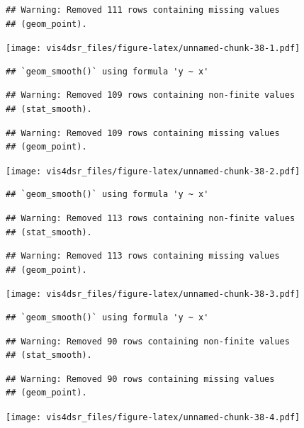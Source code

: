\documentclass[
]{krantz}
\begin{document}
\begin{verbatim}
## Warning: Removed 111 rows containing missing values
## (geom_point).
\end{verbatim}

\texttt{[image: vis4dsr\_files/figure-latex/unnamed-chunk-38-1.pdf]}

\begin{verbatim}
## `geom_smooth()` using formula 'y ~ x'
\end{verbatim}

\begin{verbatim}
## Warning: Removed 109 rows containing non-finite values
## (stat_smooth).
\end{verbatim}

\begin{verbatim}
## Warning: Removed 109 rows containing missing values
## (geom_point).
\end{verbatim}

\texttt{[image: vis4dsr\_files/figure-latex/unnamed-chunk-38-2.pdf]}

\begin{verbatim}
## `geom_smooth()` using formula 'y ~ x'
\end{verbatim}

\begin{verbatim}
## Warning: Removed 113 rows containing non-finite values
## (stat_smooth).
\end{verbatim}

\begin{verbatim}
## Warning: Removed 113 rows containing missing values
## (geom_point).
\end{verbatim}

\texttt{[image: vis4dsr\_files/figure-latex/unnamed-chunk-38-3.pdf]}

\begin{verbatim}
## `geom_smooth()` using formula 'y ~ x'
\end{verbatim}

\begin{verbatim}
## Warning: Removed 90 rows containing non-finite values
## (stat_smooth).
\end{verbatim}

\begin{verbatim}
## Warning: Removed 90 rows containing missing values
## (geom_point).
\end{verbatim}

\texttt{[image: vis4dsr\_files/figure-latex/unnamed-chunk-38-4.pdf]}
\end{document}
